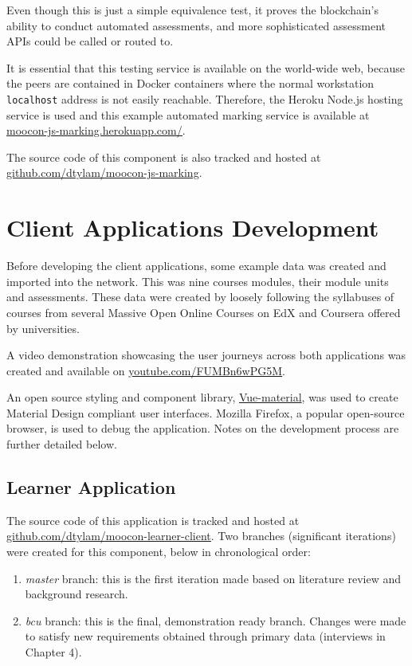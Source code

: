 Even though this is just a simple equivalence test, it proves the blockchain's ability to conduct automated assessments, 
and more sophisticated assessment APIs could be called or routed to.

It is essential that this testing service is available on the world-wide web, because the peers are contained in Docker
containers where the normal workstation \texttt{localhost} address is not easily reachable. Therefore, the Heroku Node.js 
hosting service is used and this example automated marking service is available at 
\href{https://moocon-js-marking.herokuapp.com/}{\underline{moocon-js-marking.herokuapp.com/}}.

The source code of this component is also tracked and hosted at 
\href{https://github.com/dtylam/moocon-js-marking}{\underline{github.com/dtylam/moocon-js-marking}}.

\section{Client Applications Development}

Before developing the client applications, some example data was created and imported into the network. 
This was nine courses modules, their module units and assessments. These data were created by loosely following 
the syllabuses of courses from several Massive Open Online Courses on EdX and Coursera offered by universities.

A video demonstration showcasing the user journeys across both applications was created and 
available on \href{https://youtu.be/FUMBn6wPG5M}{\underline{youtube.com/FUMBn6wPG5M}}.

An open source styling and component library, \href{https://vuematerial.io/}{Vue-material}, was used to 
create Material Design compliant user interfaces. 
Mozilla Firefox, a popular open-source browser, is used to debug the application.
Notes on the development process are further detailed below.

\subsection{Learner Application}

The source code of this application is tracked and hosted at 
\href{https://github.com/dtylam/moocon-learner-client}{\underline{github.com/dtylam/moocon-learner-client}}.
Two branches (significant iterations) were created for this component, below in chronological order:
\begin{enumerate}
	\setlength\itemsep{0em}
	\item \textit{master} branch: this is the first iteration made based on literature review and background research.
	\item \textit{bcu} branch: this is the final, demonstration ready branch. 
	Changes were made to satisfy new requirements obtained through primary data (interviews in Chapter 4).
\end{enumerate}

